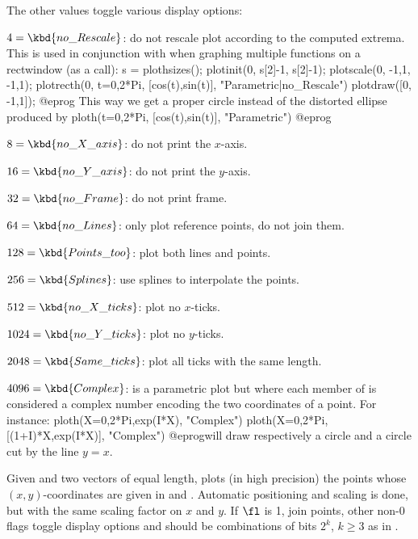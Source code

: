 The other values toggle various display options:

\item $4 = \kbd{no\_Rescale}$: do not rescale plot according to the
computed extrema. This is used in conjunction with  when
graphing multiple functions on a rectwindow (as a  call):
\bprog
  s = plothsizes();
  plotinit(0, s[2]-1, s[2]-1);
  plotscale(0, -1,1, -1,1);
  plotrecth(0, t=0,2*Pi, [cos(t),sin(t)], "Parametric|no_Rescale")
  plotdraw([0, -1,1]);
@eprog\noindent
This way we get a proper circle instead of the distorted ellipse produced by
\bprog
  ploth(t=0,2*Pi, [cos(t),sin(t)], "Parametric")
@eprog

\item $8 = \kbd{no\_X\_axis}$: do not print the $x$-axis.

\item $16 = \kbd{no\_Y\_axis}$: do not print the $y$-axis.

\item $32 = \kbd{no\_Frame}$: do not print frame.

\item $64 = \kbd{no\_Lines}$: only plot reference points, do not join them.

\item $128 = \kbd{Points\_too}$: plot both lines and points.

\item $256 = \kbd{Splines}$: use splines to interpolate the points.

\item $512 = \kbd{no\_X\_ticks}$: plot no $x$-ticks.

\item $1024 = \kbd{no\_Y\_ticks}$: plot no $y$-ticks.

\item $2048 = \kbd{Same\_ticks}$: plot all ticks with the same length.

\item $4096 = \kbd{Complex}$: is a parametric plot but where each member of
 is considered a complex number encoding the two coordinates of a
point. For instance:
\bprog
ploth(X=0,2*Pi,exp(I*X), "Complex")
ploth(X=0,2*Pi,[(1+I)*X,exp(I*X)], "Complex")
@eprog\noindent will draw respectively a circle and a circle cut by the line
$y=x$.

\label{se:plothraw}
Given  and  two vectors of equal length, plots (in
high precision) the points whose $(x,y)$-coordinates are given in
 and . Automatic positioning and scaling is done, but
with the same scaling factor on $x$ and $y$. If $\fl$ is 1, join points,
other non-0 flags toggle display options and should be combinations of bits
$2^k$, $k \geq 3$ as in .

